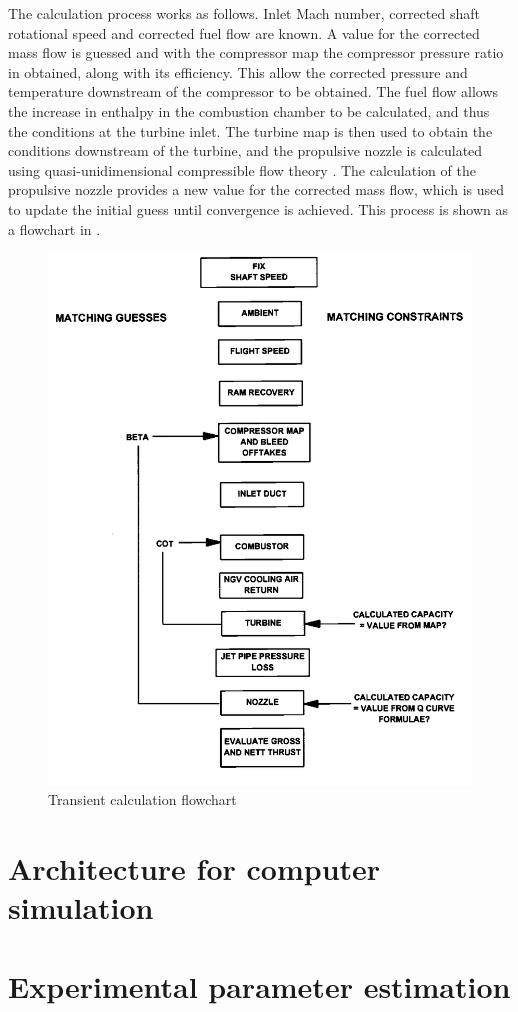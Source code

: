 The calculation process works as follows.
Inlet Mach number, corrected shaft rotational speed and corrected fuel flow are known.
A value for the corrected mass flow is guessed and with the compressor map the compressor pressure ratio in obtained, along with its efficiency.
This allow the corrected pressure and temperature downstream of the compressor to be obtained.
The fuel flow allows the increase in enthalpy in the combustion chamber to be calculated, and thus the conditions at the turbine inlet.
The turbine map is then used to obtain the conditions downstream of the turbine, and the propulsive nozzle is calculated using quasi-unidimensional compressible flow theory \cite{anderson}.
The calculation of the propulsive nozzle provides a new value for the corrected mass flow, which is used to update the initial guess until 
 convergence is achieved.
This process is shown as a flowchart in .

\begin{figure}
    \centering
    \caption{Transient calculation flowchart}
    \label{fig:transient_calculation}
    \includegraphics[width=\textwidth]{fig/transient_calculation_flowchart.png}
\end{figure}

\section{Architecture for computer simulation}
\section{Experimental parameter estimation}

